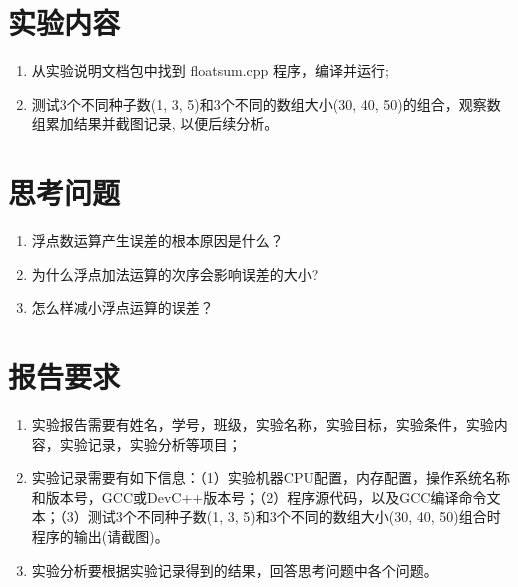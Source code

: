 \section{实验内容}

\begin{enumerate}
	\item 从实验说明文档包中找到 floatsum.cpp 程序，编译并运行;
	\item 测试3个不同种子数(1, 3, 5)和3个不同的数组大小(30, 40, 50)的组合，观察数组累加结果并截图记录, 以便后续分析。
\end{enumerate}

\section{思考问题}

\begin{enumerate}
	\item 浮点数运算产生误差的根本原因是什么？
	\item 为什么浮点加法运算的次序会影响误差的大小?
	\item 怎么样减小浮点运算的误差？
\end{enumerate}

\section{报告要求}

\begin{enumerate}
	\item 实验报告需要有姓名，学号，班级，实验名称，实验目标，实验条件，实验内容，实验记录，实验分析等项目；
	\item 实验记录需要有如下信息：（1）实验机器CPU配置，内存配置，操作系统名称和版本号，GCC或DevC++版本号；（2）程序源代码，以及GCC编译命令文本；（3）测试3个不同种子数(1, 3, 5)和3个不同的数组大小(30, 40, 50)组合时程序的输出(请截图)。
	\item 实验分析要根据实验记录得到的结果，回答思考问题中各个问题。
\end{enumerate}

